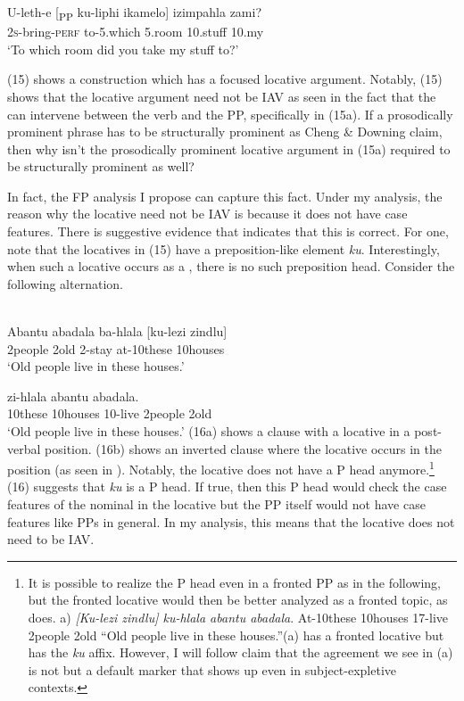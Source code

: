 \documentclass[output=paper
,newtxmath
,modfonts
,nonflat]{langsci/langscibook}
\begin{document}
\ex\label{ex:selvanathan:15b}
	\gll U-leth-e          [\textsubscript{PP} ku-liphi   ikamelo]   izimpahla  zami?\\
	2\textsc{s}{}-bring-\textsc{perf}   {}   to-5.which   5.room     10.stuff     10.my\\
	\glt `To which room did you take my stuff to?'
\z
\z

(15) shows a construction which has a focused locative argument. Notably, (15) shows that the locative argument need not be IAV as seen in the fact that the  can intervene between the verb and the PP, specifically in (15a). If a prosodically prominent phrase has to be structurally prominent as Cheng \& Downing claim, then why isn't the prosodically prominent locative argument in (15a) required to be structurally prominent as well? 

In fact, the FP analysis I propose can capture this fact. Under my analysis, the reason why the locative need not be IAV is because it does not have case features. There is suggestive evidence that indicates that this is correct. For one, note that the locatives in (15) have a preposition-like element \textit{ku}. Interestingly, when such a locative occurs as a , there is no such preposition head. Consider the following alternation.

\ea\label{ex:selvanathan:16}
 \citep[107]{Buell2007}\\
\ea\label{ex:selvanathan:16a}
\gll Abantu  abadala  ba-hlala  [ku-lezi   zindlu] \\
2people   2old     2-stay   at-10these   10houses\\
\glt `Old people live in these houses.' 

\ex\label{ex:selvanathan:16b}
	  zi-hlala  abantu  abadala. \\
	10these   10houses   10-live   2people   2old\\
	\glt `Old people live in these houses.' 
\z
\z
(16a) shows a clause with a locative in a post-verbal position. (16b) shows an inverted clause where the locative occurs in the  position (as seen in ). Notably, the locative does not have a P head anymore.\footnote{It is possible to realize the P head even in a fronted PP as in the following, but the fronted locative would then be better analyzed as a fronted topic, as \citet{Buell2007} does. a)   \citep[108]{Buell2007}  \textit{[Ku-lezi  zindlu]    ku-hlala  abantu   abadala}.   At-10these   10houses   17-live     2people  2old  “Old people live in these houses.”(a) has a fronted locative but has the \textit{ku} affix. However, I will follow  claim that the agreement we see in (a) is not  but a default marker that shows up even in subject-expletive contexts.} (16) suggests that \textit{ku} is a P head. If true, then this P head would check the case features of the nominal in the locative but the PP itself would not have case features like PPs in general. In my analysis, this means that the locative does not need to be IAV. 
\end{document}
